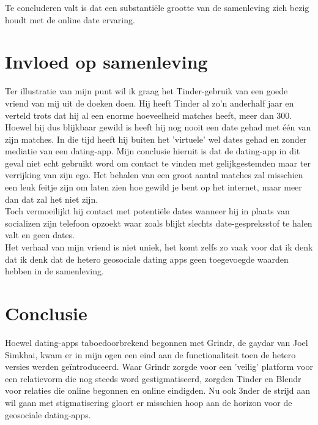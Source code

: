 \documentclass[pdftex,12pt,a4paper]{article}
\begin{document}
Te concluderen valt is dat  een substantiële grootte van de samenleving zich bezig houdt met de online date ervaring.

\section{Invloed op samenleving}
Ter illustratie van mijn punt wil ik graag het Tinder-gebruik van een goede vriend van mij uit de doeken doen. Hij heeft Tinder al zo'n anderhalf jaar en verteld trots dat hij al een enorme hoeveelheid matches heeft, meer dan 300. Hoewel hij dus blijkbaar gewild is heeft hij nog nooit een date gehad met één van zijn matches. In die tijd heeft hij buiten het 'virtuele' wel dates gehad en zonder mediatie van een dating-app. Mijn conclusie hieruit is dat de dating-app in dit geval niet echt gebruikt word om contact te vinden met gelijkgestemden maar ter verrijking van zijn ego. Het behalen van een groot aantal matches zal misschien een leuk feitje zijn om laten zien hoe gewild je bent op het internet, maar meer dan dat zal het niet zijn.\\
Toch vermoeilijkt hij contact met potentiële dates wanneer hij in plaats van socializen zijn telefoon opzoekt waar zoals blijkt slechts date-gespreksstof te halen valt en geen dates.\\

Het verhaal van mijn vriend is niet uniek, het komt  zelfs zo vaak voor dat ik denk dat ik denk dat de hetero geosociale dating apps geen toegevoegde waarden hebben in de samenleving.

\section{Conclusie}
Hoewel dating-apps taboedoorbrekend begonnen met Grindr, de gaydar van Joel Simkhai, kwam er in mijn ogen een eind aan de functionaliteit toen de hetero versies werden geïntroduceerd. Waar Grindr zorgde voor een 'veilig' platform voor een relatievorm die nog steeds word gestigmatiseerd, zorgden Tinder en Blendr voor relaties die online begonnen en online eindigden. Nu ook 3nder de strijd aan wil gaan met stigmatisering gloort er misschien hoop aan de horizon voor de geosociale dating-apps. 

\end{document}
